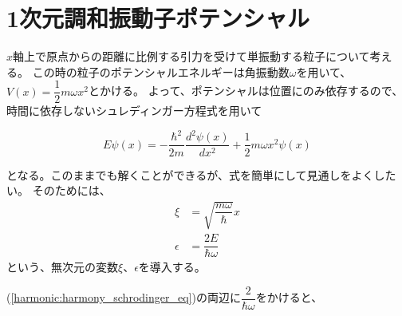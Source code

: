 
\section{1次元調和振動子ポテンシャル}
$x$軸上で原点からの距離に比例する引力を受けて単振動する粒子について考える。
この時の粒子のポテンシャルエネルギーは角振動数$\omega$を用いて、$V(x) = \dfrac{1}{2}m\omega x^2$とかける。
よって、ポテンシャルは位置にのみ依存するので、時間に依存しないシュレディンガー方程式を用いて

\begin{equation}
  \label{harmonic:harmony_schrodinger_eq}
  E\psi(x) = - \dfrac{\hbar^2}{2m} \dfrac{d^2 \psi(x)}{d x^2} + \dfrac{1}{2}m\omega x^2\psi(x)
\end{equation}

となる。このままでも解くことができるが、式を簡単にして見通しをよくしたい。
そのためには、
\begin{align}
  \label{harmonic:xi}
  \xi &= \sqrt{\dfrac{m\omega}{\hbar}}x \\
  \label{harmonic:eps}
  \epsilon &= \dfrac{2E}{\hbar\omega}
\end{align}
という、無次元の変数$\xi$、$\epsilon$を導入する。

(\ref{harmonic:harmony_schrodinger_eq})の両辺に$\dfrac{2}{\hbar\omega}$をかけると、

